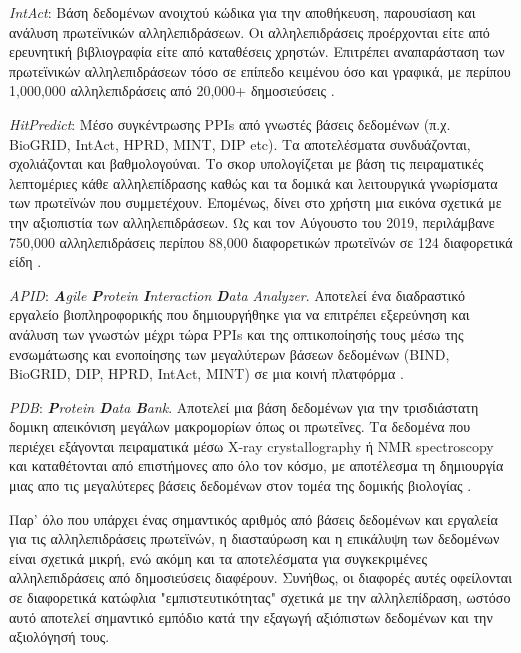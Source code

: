 \medskip
\textit{IntAct}: Βάση δεδομένων ανοιχτού κώδικα για την αποθήκευση, παρουσίαση και ανάλυση πρωτεϊνικών αλληλεπιδράσεων. Οι αλληλεπιδράσεις προέρχονται είτε από ερευνητική βιβλιογραφία είτε από καταθέσεις χρηστών. Επιτρέπει αναπαράσταση των πρωτεϊνικών αλληλεπιδράσεων τόσο σε επίπεδο κειμένου όσο και γραφικά, με περίπου 1,000,000 αλληλεπιδράσεις από 20,000+ δημοσιεύσεις \cite{Hermjakob2004}.

\medskip
\textit{HitPredict}: Μέσο συγκέντρωσης PPIs από γνωστές βάσεις δεδομένων (π.χ. BioGRID, IntAct, HPRD, MINT, DIP etc). Τα αποτελέσματα συνδυάζονται, σχολιάζονται και βαθμολογούναι. Το σκορ υπολογίζεται με βάση τις πειραματικές λεπτομέριες κάθε αλληλεπίδρασης καθώς και τα δομικά και λειτουργικά γνωρίσματα των πρωτεϊνών που συμμετέχουν. Επομένως, δίνει στο χρήστη μια εικόνα σχετικά με την αξιοπιστία των αλληλεπιδράσεων. Ως και τον Αύγουστο του 2019, περιλάμβανε 750,000 αλληλεπιδράσεις περίπου 88,000 διαφορετικών πρωτεϊνών σε 124 διαφορετικά είδη \cite{Patil2010}.

\medskip
\textit{APID}: \textit{\textbf{A}gile \textbf{P}rotein \textbf{I}nteraction \textbf{D}ata Analyzer}. Αποτελεί ένα διαδραστικό εργαλείο βιοπληροφορικής που δημιουργήθηκε για να επιτρέπει εξερεύνηση και ανάλυση των γνωστών μέχρι τώρα PPIs και της οπτικοποίησής τους μέσω της ενσωμάτωσης και ενοποίησης των μεγαλύτερων βάσεων δεδομένων (BIND, BioGRID, DIP, HPRD, IntAct, MINT) σε μια κοινή πλατφόρμα \cite{Prieto2006}. 

\medskip
\textit{PDB}: \textit{\textbf{P}rotein \textbf{D}ata \textbf{B}ank}. Αποτελεί μια βάση δεδομένων για την τρισδιάστατη δομικη απεικόνιση μεγάλων μακρομορίων όπως οι πρωτεΐνες. Τα δεδομένα που περιέχει εξάγονται πειραματικά μέσω X-ray crystal\-lography ή NMR spectroscopy και καταθέτονται από επιστήμονες απο όλο τον κόσμο, με αποτέλεσμα τη δημιουργία μιας απο τις μεγαλύτερες βάσεις δεδομένων στον τομέα της δομικής βιολογίας \cite{Burley2018}.

\medskip
Παρ' όλο που υπάρχει ένας σημαντικός αριθμός από βάσεις δεδομένων και εργαλεία για τις αλληλεπιδράσεις πρωτεϊνών, η διασταύρωση και η επικάλυψη των δεδομένων είναι σχετικά μικρή, ενώ ακόμη και τα αποτελέσματα για συγκεκριμένες αλληλεπιδράσεις από δημοσιεύσεις διαφέρουν. Συνήθως, οι διαφορές αυτές οφείλονται σε διαφορετικά κατώφλια "εμπιστευτικότητας" σχετικά με την αλληλεπίδραση, ωστόσο αυτό αποτελεί σημαντικό εμπόδιο κατά την εξαγωγή αξιόπιστων δεδομένων και την αξιολόγησή τους. 